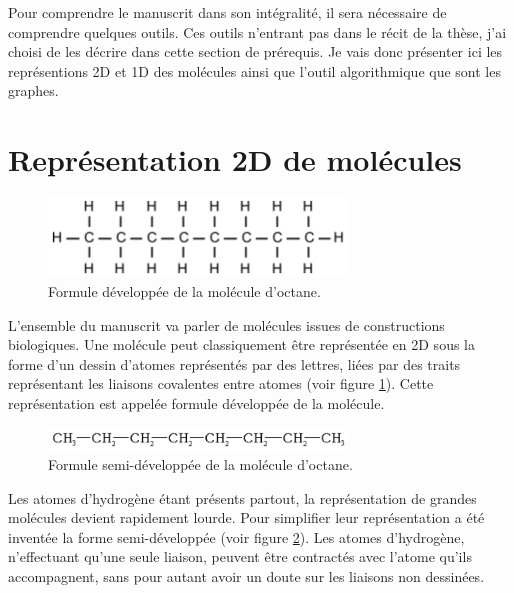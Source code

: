 Pour comprendre le manuscrit dans son intégralité, il sera nécessaire de comprendre quelques outils.
Ces outils n'entrant pas dans le récit de la thèse, j'ai choisi de les décrire dans cette section de prérequis.
Je vais donc présenter ici les représentions 2D et 1D des molécules ainsi que l'outil algorithmique que sont les graphes.

\section{Représentation 2D de molécules}

\begin{figure}[h!]
  \begin{center}
    \includegraphics[width=300px]{Figures/Prerequis/developpee.png}
    \caption{\label{dev}Formule développée de la molécule d'octane.}
  \end{center}
\end{figure}

L'ensemble du manuscrit va parler de molécules issues de constructions biologiques.
Une molécule peut classiquement être représentée en 2D sous la forme d'un dessin d'atomes représentés par des lettres, liées par des traits représentant les liaisons covalentes entre atomes (voir figure \ref{dev}).
Cette représentation est appelée formule développée de la molécule.

\begin{figure}[h!]
  \begin{center}
    \includegraphics[width=300px]{Figures/Prerequis/semi.png}
    \caption{\label{semi}Formule semi-développée de la molécule d'octane.}
  \end{center}
\end{figure}

Les atomes d'hydrogène étant présents partout, la représentation de grandes molécules devient rapidement lourde.
Pour simplifier leur représentation a été inventée la forme semi-développée (voir figure \ref{semi}).
Les atomes d'hydrogène, n'effectuant qu'une seule liaison, peuvent être contractés avec l'atome qu'ils accompagnent, sans pour autant avoir un doute sur les liaisons non dessinées.



